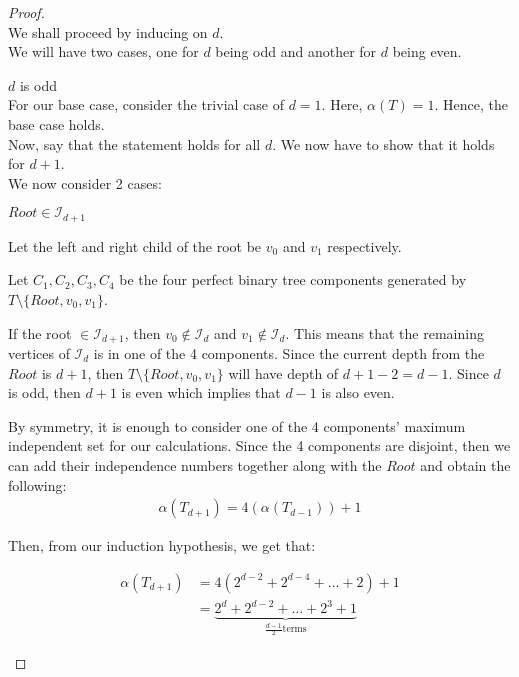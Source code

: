 \documentclass{article}
\theoremstyle{definition}
\begin{document}
\begin{proof}
	$ $ \\
	We shall proceed by inducing on $d$.\\
	We will have two cases, one for $d$ being odd and another for $d$ being even.
	\begin{caseof}
		\item $d$ is odd \\

		For our base case, consider the trivial case of $d = 1$. Here, $\alpha(T) = 1$. Hence, the base case holds. \\

		Now, say that the statement holds for all $d$. We now have to show that it holds for $d+1$. \\

		We now consider 2 cases:

		\begin{subcaseof}
			\item $Root \in \mathcal{I}_{d + 1}$

			Let the left and right child of the root be $v_0$ and $v_1$ respectively.

			Let $C_1, C_2, C_3, C_4$ be the four perfect binary tree components generated by $T \setminus \{Root, v_0, v_1\}$.

			If the root $\in \mathcal{I}_{d + 1}$, then $v_0 \not\in \mathcal{I}_d$ and $v_1 \not\in \mathcal{I}_d$. This means that the remaining vertices of $\mathcal{I}_d$ is in one of the 4 components.
			Since the current depth from the $Root$ is $d + 1$, then $T \setminus \{Root, v_0, v_1\}$ will have depth of $d + 1 - 2 = d - 1$. Since $d$ is odd, then $d + 1$ is even which implies that $d - 1$ is also even.

			By symmetry, it is enough to consider one of the 4 components' maximum independent set for our calculations. Since the 4 components are disjoint, then we can add their independence numbers together along with the $Root$ and obtain the following:
			\begin{align*}
				\alpha(T_{d + 1}) = 4(\alpha(T_{d - 1})) + 1
			\end{align*}

			Then, from our induction hypothesis, we get that:

			\begin{align}
				\alpha(T_{d+1}) & = 4(2^{d - 2} + 2^{d - 4} + \ldots + 2) + 1                           \\
						& = \underbrace{2^d + 2^{d - 2} + \ldots + 2^3 + 1}_{\frac{d-1}{2} \text{terms}} \label{eq:odd_case}
			\end{align}


\end{subcaseof}
\end{caseof}
\end{proof}
\end{document}
